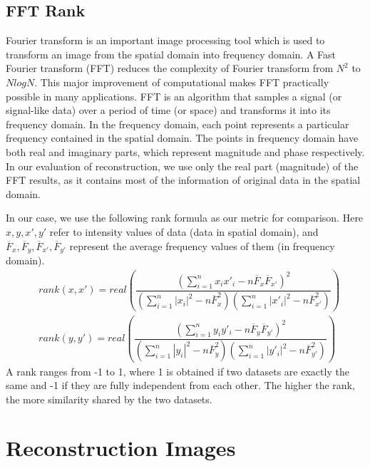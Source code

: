 \documentclass[12pt]{report} %
\begin{document}
\subsection{FFT Rank}
Fourier transform\cite{FT} is an important image processing tool which is used to transform an image from the spatial domain into frequency domain. A Fast Fourier transform (FFT)\cite{FFT} reduces the complexity of Fourier transform from $N^2$ to $NlogN$. This major improvement of computational makes FFT practically possible in many applications. FFT is an algorithm that samples a signal (or signal-like data) over a period of time (or space) and transforms it into its frequency domain. In the frequency domain, each point represents a particular frequency contained in the spatial domain. The points in frequency domain have both real and imaginary parts, which represent magnitude and phase respectively. In our evaluation of reconstruction, we use only the real part (magnitude) of the FFT results, as it contains most of the information of original data in the spatial domain. 

In our case, we use the following rank formula as our metric for comparison. Here $x,y,x',y'$ refer to intensity values of data (data in spatial domain), and $\overline F_x,\overline F_y,\overline F_{x'},\overline F_{y'}$ represent the average frequency values of them (in frequency domain)\cite{ISA}.
\begin{equation}
\begin{split}
&rank(x,x')=real(\dfrac{(\sum_{i=1}^{n} x_{i}x'_{i}-n\overline F_{x} \overline F_{x'})^2}{(\sum_{i=1}^{n} |x_i|^2-n\overline F_{x}^2)(\sum_{i=1}^{n} |x'_i|^2-n\overline F_{x'}^2)}) \\
&rank(y,y')=real(\dfrac{(\sum_{i=1}^{n} y_{i}y'_{i}-n\overline F_{y} \overline F_{y'})^2}{(\sum_{i=1}^{n} |y_i|^2-n\overline F_{y}^2)(\sum_{i=1}^{n} |y'_i|^2-n\overline F_{y'}^2)})
\end{split}
\end{equation}
A rank ranges from -1 to 1, where 1 is obtained if two datasets are exactly the same and -1 if they are fully independent from each other. The higher the rank, the more similarity shared by the two datasets.

\section{Reconstruction Images}
\end{document}
